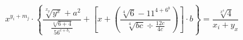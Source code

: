 \documentclass[11 pt] {beamer}
\begin{document}
$$ x^{y_i+m_j}\cdot\left\{{\frac{\sqrt[x_y]{y^x}+a^2}{\frac{\sqrt[4]{6+4}}{56^{c+b_i}}}}+\left[{x}+\left({\frac{\sqrt[4]{6}-11^{4+6^b}}{\sqrt[4]{bc}\div{\frac{12c}{4c}}}}\right)\right]\cdot{b} \right\}= \frac{\sqrt[x^4]{4}}{x_i+y_x} $$
\end{document}
